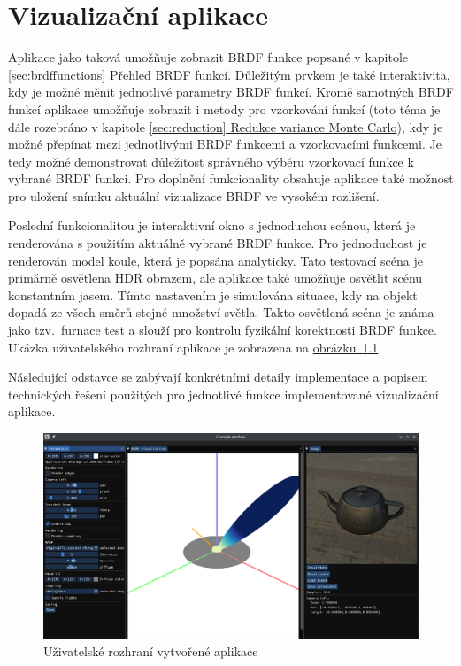 \documentclass[czech,master]{diploma}
\begin{document}
\clearpage
\chapter{Vizualizační aplikace}
Aplikace jako taková umožňuje zobrazit BRDF funkce popsané v kapitole \hyperref[sec:brdffunctions]{\ref{sec:brdffunctions} Přehled BRDF funkcí}. Důležitým prvkem je také interaktivita, kdy je možné měnit jednotlivé parametry BRDF funkcí. Kromě samotných BRDF funkcí aplikace umožňuje zobrazit i metody pro vzorkování funkcí (toto téma je dále rozebráno v kapitole \hyperref[sec:reduction]{\ref{sec:reduction} Redukce variance Monte Carlo}), kdy je možné přepínat mezi jednotlivými BRDF funkcemi a vzorkovacími funkcemi. Je tedy možné demonstrovat důležitost správného výběru vzorkovací funkce k vybrané BRDF funkci. Pro doplnění funkcionality obsahuje aplikace také možnost pro uložení snímku aktuální vizualizace BRDF ve vysokém rozlišení.\par
Poslední funkcionalitou je interaktivní okno s jednoduchou scénou, která je renderována s použitím aktuálně vybrané BRDF funkce. Pro jednoduchost je renderován model koule, která je popsána analyticky. Tato testovací scéna je primárně osvětlena HDR obrazem, ale aplikace také umožňuje osvětlit scénu konstantním jasem. Tímto nastavením je simulována situace, kdy na objekt dopadá ze všech směrů stejné množství světla. Takto osvětlená scéna je známa jako tzv.\ furnace test a slouží pro kontrolu fyzikální korektnosti BRDF funkce. Ukázka uživatelského rozhraní aplikace je zobrazena na \hyperref[fig:myapp]{obrázku~\ref{fig:myapp}}.\par
Následující odstavce se zabývají konkrétními detaily implementace a popisem technických řešení použitých pro jednotlivé funkce implementované vizualizační aplikace.

\begin{figure}[ht]
  \centering
  \includegraphics[width=15cm]{Figures/visualizations/MyBRDFVizApp.png}
  \caption{Uživatelské rozhraní vytvořené aplikace}%
  \label{fig:myapp}%
\end{figure}
\end{document}
